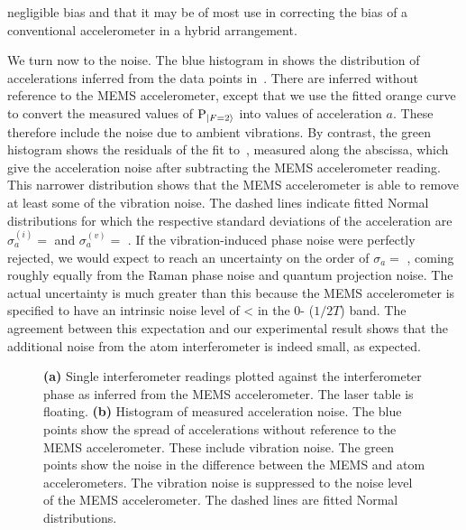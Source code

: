 negligible bias and that it may be of most use in correcting the bias
of a conventional accelerometer in a hybrid arrangement.
\par\noindent
We turn now to the noise. The blue histogram in
 shows the distribution of
accelerations inferred from the data points
in~. There are inferred without reference to
the MEMS accelerometer, except that we use the fitted orange curve to
convert the measured values of $\text{P}_{\ket{F=2}}$ into values of
acceleration $a$. These therefore include the noise due to ambient
vibrations. By contrast, the green histogram shows the residuals of
the fit to~, measured along the abscissa, which
give the acceleration noise after subtracting the MEMS accelerometer
reading. This narrower distribution shows that the MEMS accelerometer
is able to remove at least some of the vibration noise.
The dashed lines indicate fitted Normal
distributions for which the respective standard deviations of the acceleration
are $\sigma_a^{(i)} =$  and
$\sigma_a^{(v)} = $ . If the vibration-induced phase noise
were perfectly rejected, we would expect to reach an uncertainty on the order
of $\sigma_a =$ , coming roughly equally
from the Raman phase noise and quantum projection noise.
The actual uncertainty is much greater than this because the 
MEMS accelerometer is specified to
have an intrinsic noise level of <  in the
0- ($1/2T$) band. The agreement between this
expectation and our experimental result shows that the additional
noise from the atom interferometer is indeed small, as expected.\nocite{Macdonald1992} 
\begin{figure}[htpb!]
  \centering
  \caption[MEMS/Interferometer correlation in a
    low vibration
    environment.]{\textbf{(a)} Single interferometer readings plotted
      against the interferometer phase as inferred from the MEMS
      accelerometer. The laser table is floating. \textbf{(b)}
    Histogram of measured acceleration noise. The blue points show the
  spread of accelerations without reference to the MEMS accelerometer.
These include vibration noise. The green points show the noise in the
difference between the MEMS and atom accelerometers. The vibration
noise is suppressed to the noise level of the MEMS accelerometer. The dashed lines are fitted Normal distributions.}
  \label{fig:vib_comparison}
\end{figure}
